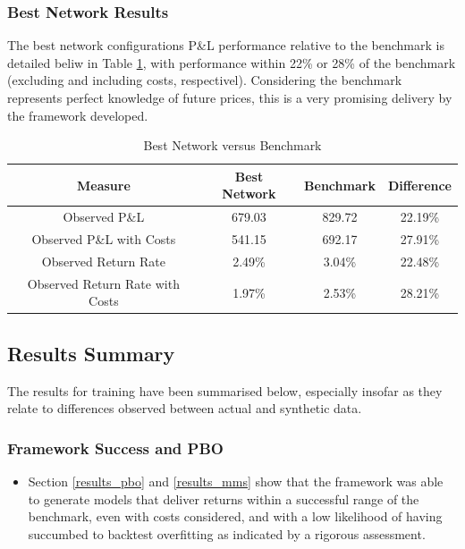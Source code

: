 \documentclass[a4paper,11pt,oneside]{article}
\theoremstyle{plain}
\theoremstyle{definition}
\begin{document}
	\subsubsection{Best Network Results}
	
	The best network configurations P\&L performance relative to the benchmark is detailed beliw in Table \ref{table_best_network}, with performance within 22\% or 28\% of the benchmark (excluding and including costs, respectivel). Considering the benchmark represents perfect knowledge of future prices, this is a very promising delivery by the framework developed.
	
	\begin{table}[H]
		\centering
		\begin{tabular}{|c|c|c|c|}
			\hline
			\textbf{Measure} &\textbf{Best Network} & \textbf{Benchmark} & \textbf{Difference}\\\hline	
			{Observed P\&L} & {679.03} & {829.72} & {22.19\%} \\\hline
			{Observed P\&L with Costs} & {541.15} & {692.17} & {27.91\%} \\\hline
			{Observed Return Rate} & {2.49\%} & {3.04\%} & {22.48\%} \\\hline
			{Observed Return Rate with Costs} & {1.97\%} & {2.53\%} & {28.21\%} \\\hline
		\end{tabular}
		\newline\newline
		\caption{Best Network versus Benchmark}\label{tab_bestvsbenchmark}
		\label{table_best_network}
	\end{table}
	
	
	
	
	\newpage
	\subsection{Results Summary}\label{results_summary}
	
	The results for training have been summarised below, especially insofar as they relate to differences observed between actual and synthetic data.
	
	\subsubsection{Framework Success and PBO}
	\begin{itemize}
		\item[1] Section \ref{results_pbo} and \ref{results_mms} show that the framework was able to generate models that deliver returns within a successful range of the benchmark, even with costs considered, and with a low likelihood of having succumbed to backtest overfitting as indicated by a rigorous assessment.
	\end{itemize}
	
\end{document}
